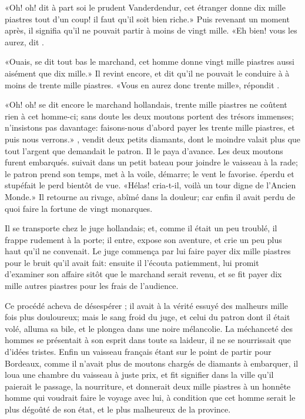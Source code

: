 «Oh! oh! dit à part soi le prudent Vanderdendur, cet étranger donne dix
mille piastres tout d’un coup! il faut qu’il soit bien riche.» Puis
revenant un moment après, il signifia qu’il ne pouvait partir à moins
de vingt mille. «Eh bien! vous les aurez, dit .

«Ouais, se dit tout bas le marchand, cet homme donne vingt mille
piastres aussi aisément que dix mille.» Il revint encore, et dit qu’il
ne pouvait le conduire à   à moins de trente mille piastres. «Vous
en aurez donc trente mille», répondit .

«Oh! oh! se dit encore le marchand hollandais, trente mille piastres ne
coûtent rien à cet homme-ci; sans doute les deux moutons portent des
trésors immenses; n’insistons pas davantage: faisons-nous d’abord payer
les trente mille piastres, et puis nous verrons.» , vendit deux
petits diamants, dont le moindre valait plus que tout l’argent que
demandait le patron. Il le paya d’avance. Les deux moutons furent
embarqués.  suivait dans un petit bateau pour joindre le
vaisseau à la rade; le patron prend son temps, met à la voile, démarre;
le vent le favorise.  éperdu et stupéfait le perd bientôt de
vue. «Hélas! cria-t-il, voilà un tour digne de l’Ancien Monde.» Il
retourne au rivage, abîmé dans la douleur; car enfin il avait perdu de
quoi faire la fortune de vingt monarques.

Il se transporte chez le juge hollandais; et, comme il était un peu
troublé, il frappe rudement à la porte; il entre, expose son aventure,
et crie un peu plus haut qu’il ne convenait. Le juge commença par lui
faire payer dix mille piastres pour le bruit qu’il avait fait: ensuite
il l’écouta patiemment, lui promit d’examiner son affaire sitôt que le
marchand serait revenu, et se fit payer dix mille autres piastres pour
les frais de l’audience.

Ce procédé acheva de désespérer ; il avait à la vérité essuyé
des malheurs mille fois plus douloureux; mais le sang froid du juge, et
celui du patron dont il était volé, alluma sa bile, et le plongea dans
une noire 
mélancolie. La méchanceté des hommes se présentait à son
esprit dans toute sa laideur, il ne se nourrissait que d’idées tristes.
Enfin un vaisseau français étant sur le point de partir pour Bordeaux,
comme il n’avait plus de moutons chargés de diamants à embarquer, il
loua une chambre du vaisseau à juste prix, et fit signifier dans la
ville qu’il paierait le passage, la nourriture, et donnerait deux mille
piastres à un honnête homme qui voudrait faire le voyage avec lui, à
condition que cet homme serait le plus dégoûté de son état, et le plus
malheureux de la province.


